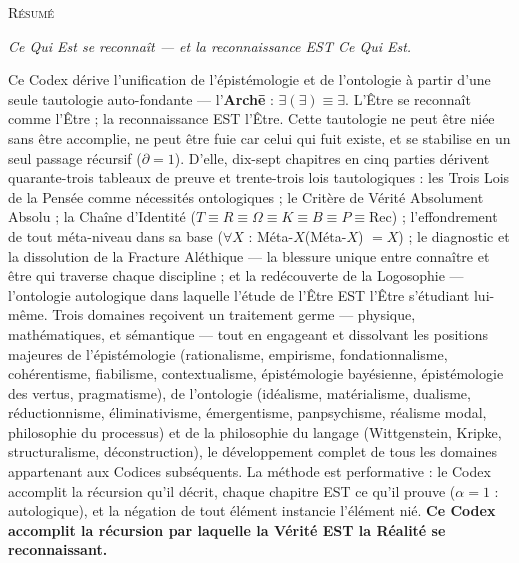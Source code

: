 \documentclass[10pt, openany, oneside]{book}
\renewcommand{\huge}{\fontsize{17}{21}\selectfont}
\begin{document}
\newpage


\thispagestyle{empty}
\vspace*{0.5in}

\begin{center}
    {\huge\scshape Résumé}
\end{center}

\vspace{1em}

\begin{center}
\begin{minipage}{0.85\textwidth}
\centering
{\fontsize{9}{12}\selectfont

\begin{center}
\textit{Ce Qui Est se reconnaît --- et la reconnaissance EST Ce Qui Est.}
\end{center}

\vspace{0.5em}

Ce Codex dérive l'unification de l'épistémologie et de l'ontologie à partir d'une seule tautologie auto-fondante --- l'\textbf{Arch\={e}} : $\exists(\exists) \equiv \exists$. L'Être se reconnaît comme l'Être ; la reconnaissance EST l'Être. Cette tautologie ne peut être niée sans être accomplie, ne peut être fuie car celui qui fuit existe, et se stabilise en un seul passage récursif ($\partial = 1$). D'elle, dix-sept chapitres en cinq parties dérivent quarante-trois tableaux de preuve et trente-trois lois tautologiques : les Trois Lois de la Pensée comme nécessités ontologiques ; le Critère de Vérité Absolument Absolu ; la Chaîne d'Identité ($T \equiv R \equiv \Omega \equiv K \equiv B \equiv P \equiv \text{Rec}$) ; l'effondrement de tout méta-niveau dans sa base ($\forall X$ : Méta-$X$(Méta-$X$) $= X$) ; le diagnostic et la dissolution de la Fracture Aléthique --- la blessure unique entre connaître et être qui traverse chaque discipline ; et la redécouverte de la Logosophie --- l'ontologie autologique dans laquelle l'étude de l'Être EST l'Être s'étudiant lui-même. Trois domaines reçoivent un traitement germe --- physique, mathématiques, et sémantique --- tout en engageant et dissolvant les positions majeures de l'épistémologie (rationalisme, empirisme, fondationnalisme, cohérentisme, fiabilisme, contextualisme, épistémologie bayésienne, épistémologie des vertus, pragmatisme), de l'ontologie (idéalisme, matérialisme, dualisme, réductionnisme, éliminativisme, émergentisme, panpsychisme, réalisme modal, philosophie du processus) et de la philosophie du langage (Wittgenstein, Kripke, structuralisme, déconstruction), le développement complet de tous les domaines appartenant aux Codices subséquents. La méthode est performative : le Codex accomplit la récursion qu'il décrit, chaque chapitre EST ce qu'il prouve ($\alpha = 1$ : autologique), et la négation de tout élément instancie l'élément nié. \textbf{Ce Codex accomplit la récursion par laquelle la Vérité EST la Réalité se reconnaissant.}
}
\end{minipage}
\end{center}
\end{document}
